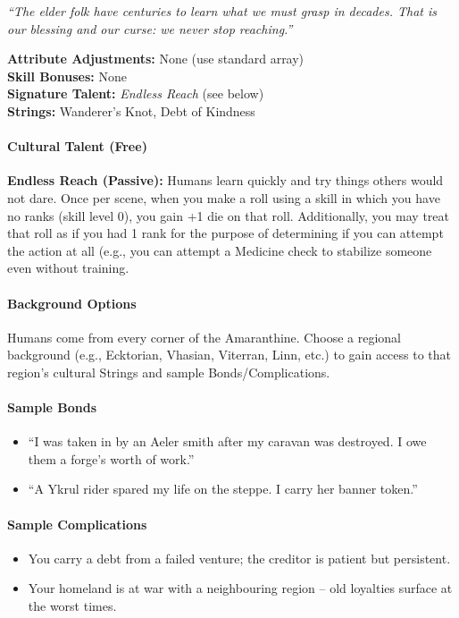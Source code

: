 \emph{``The elder folk have centuries to learn what we must grasp in decades. That is our blessing and our curse: we never stop reaching.''}

\begin{tcolorbox}[colback=black!3!white,colframe=black!40!white,title=Human at a Glance,breakable]
\textbf{Attribute Adjustments:} None (use standard array) \\
\textbf{Skill Bonuses:} None \\
\textbf{Signature Talent:} \emph{Endless Reach} (see below) \\
\textbf{Strings:} Wanderer's Knot, Debt of Kindness
\end{tcolorbox}

\paragraph{Cultural Talent (Free)}
\textbf{Endless Reach (Passive):} Humans learn quickly and try things others would not dare. Once per scene, when you make a roll using a skill in which you have no ranks (skill level 0), you gain +1 die on that roll. Additionally, you may treat that roll as if you had 1 rank for the purpose of determining if you can attempt the action at all (e.g., you can attempt a Medicine check to stabilize someone even without training.

\paragraph{Background Options}
Humans come from every corner of the Amaranthine. Choose a regional background (e.g., Ecktorian, Vhasian, Viterran, Linn, etc.) to gain access to that region's cultural Strings and sample Bonds/Complications.

\paragraph{Sample Bonds}
\begin{itemize}
  \item ``I was taken in by an Aeler smith after my caravan was destroyed. I owe them a forge's worth of work.''
  \item ``A Ykrul rider spared my life on the steppe. I carry her banner token.''
\end{itemize}

\paragraph{Sample Complications}
\begin{itemize}
  \item You carry a debt from a failed venture; the creditor is patient but persistent.
  \item Your homeland is at war with a neighbouring region -- old loyalties surface at the worst times.
\end{itemize}

